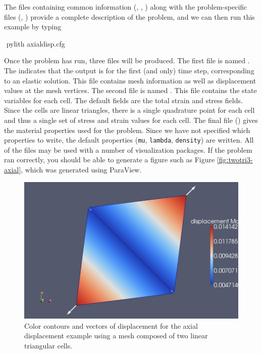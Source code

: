 The files containing common information (,
, ) along with
the problem-specific files (,
) provide a complete description of the
problem, and we can then run this example by typing
\begin{shell}
$$ pylith axialdisp.cfg
\end{shell}
Once the problem has run, three files will be produced. The first
file is named . The 
indicates that the output is for the first (and only) time step, corresponding
to an elastic solution. This file contains mesh information as well
as displacement values at the mesh vertices. The second file is named
. This file contains the
state variables for each cell. The default fields are the total strain
and stress fields. Since the cells are linear triangles, there is
a single quadrature point for each cell and thus a single set of stress
and strain values for each cell. The final file ()
gives the material properties used for the problem. Since we have
not specified which properties to write, the default properties (\texttt{mu},
\texttt{lambda}, \texttt{density}) are written. All of the 
files may be used with a number of visualization packages. If the
problem ran correctly, you should be able to generate a figure such
as Figure \vref{fig:twotri3-axial}, which was generated using ParaView.

\begin{figure}
  \includegraphics[scale=0.33]{examples/figs/twotri3-axialdisp}
  \caption{Color contours and vectors of displacement for the axial
    displacement example using a mesh composed of two linear triangular
    cells.}
  \label{fig:twotri3-axial}
\end{figure}


